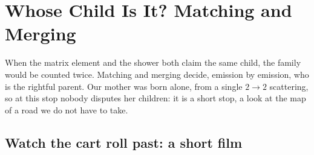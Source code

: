 \chapter{Whose Child Is It? Matching and Merging}
\label{ch:whose_child}

\begin{journeybox}
When the matrix element and the shower both claim the same child, the family
would be counted twice. Matching and merging decide, emission by emission,
who is the rightful parent. Our mother was born alone, from a single
$2\to2$ scattering, so at this stop nobody disputes her children: it is a
short stop, a look at the map of a road we do not have to take.
\end{journeybox}


\section{Watch the cart roll past: a short film}
\label{sec:whose_child:animation}

